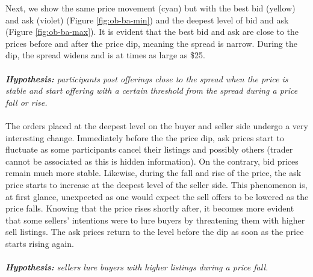 Next, we show the same price movement (cyan) but with the best bid (yellow) and ask (violet) (Figure \ref{fig:ob-ba-min}) and the deepest level of bid and ask (Figure \ref{fig:ob-ba-max}).
It is evident that the best bid and ask are close to the prices before and after the price dip, meaning the spread is narrow.
During the dip, the spread widens and is at times as large as \$25.
\\
\\
\textit{\textbf{Hypothesis:} participants post offerings close to the spread when the price is stable and start offering with a certain threshold from the spread during a price fall or rise.}
\\
\\
The orders placed at the deepest level on the buyer and seller side undergo a very interesting change.
Immediately before the the price dip, ask prices start to fluctuate as some participants cancel their listings and possibly others (trader cannot be associated as this is hidden information).
On the contrary, bid prices remain much more stable.
Likewise, during the fall and rise of the price, the ask price starts to increase at the deepest level of the seller side. 
This phenomenon is, at first glance, unexpected as one would expect the sell offers to be lowered as the price falls.
Knowing that the price rises shortly after, it becomes more evident that some sellers' intentions were to lure buyers by threatening them with higher sell listings.
The ask prices return to the level before the dip as soon as the price starts rising again.
\\
\\
\textit{\textbf{Hypothesis:} sellers lure buyers with higher listings during a price fall.}
%

